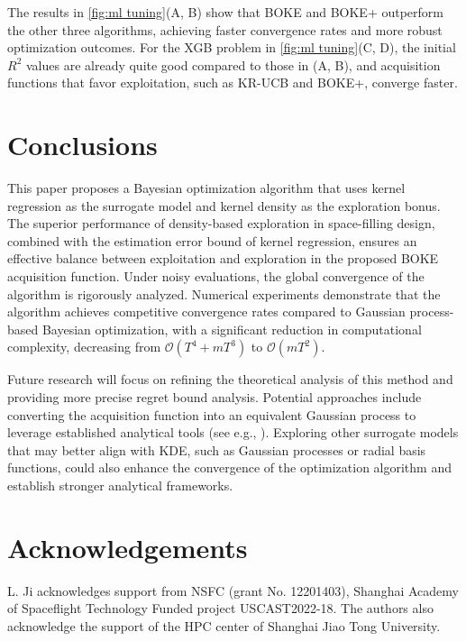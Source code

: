 \documentclass[11pt,en]{elegantpaper}
\newcommand{\1}{\mathds{1}}
\begin{document}
The results in \cref{fig:ml tuning}(A, B) show that BOKE and BOKE+ outperform the other three algorithms, achieving faster convergence rates and more robust optimization outcomes. For the XGB problem in \cref{fig:ml tuning}(C, D), the initial $R^2$ values are already quite good compared to those in (A, B), and acquisition functions that favor exploitation, such as KR-UCB and BOKE+, converge faster.




\section{Conclusions}
\label{sec:conclusions}

This paper proposes a Bayesian optimization algorithm that uses kernel regression as the surrogate model and kernel density as the exploration bonus. The superior performance of density-based exploration in space-filling design, combined with the estimation error bound of kernel regression, ensures an effective balance between exploitation and exploration in the proposed BOKE acquisition function. Under noisy evaluations, the global convergence of the algorithm is rigorously analyzed. Numerical experiments demonstrate that the algorithm achieves competitive convergence rates compared to Gaussian process-based Bayesian optimization, with a significant reduction in computational complexity, decreasing from $\mathcal{O}(T^4 + mT^3)$ to $\mathcal{O}(mT^2)$.


Future research will focus on refining the theoretical analysis of this method and providing more precise regret bound analysis.
Potential approaches include converting the acquisition function into an equivalent Gaussian process to leverage established analytical tools (see e.g., \cite{oliveira2022batch}).
Exploring other surrogate models that may better align with KDE, such as Gaussian processes or radial basis functions, could also enhance the convergence of the optimization algorithm and establish stronger analytical frameworks.




\section*{Acknowledgements}
L. Ji acknowledges support from NSFC (grant No. 12201403), Shanghai Academy of Spaceflight Technology Funded project USCAST2022-18. The authors also acknowledge the support of the HPC center of Shanghai Jiao Tong University.
\end{document}
